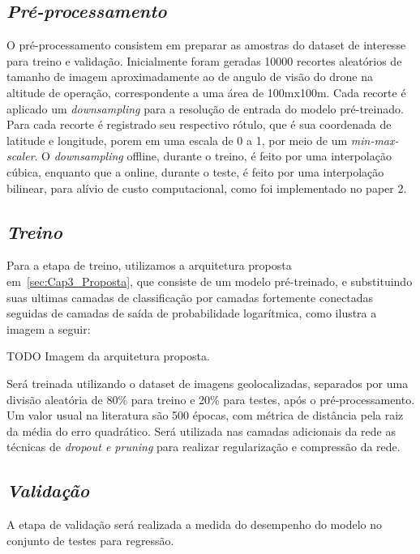 \subsection{\textit{Pré-processamento}}\label{sec:Cap3_PreProcess}
O pré-processamento consistem em preparar as amostras do dataset de interesse para treino e validação. Inicialmente foram geradas 10000 recortes aleatórios de tamanho de imagem aproximadamente ao de angulo de visão do drone na altitude de operação, correspondente a uma área de 100mx100m. Cada recorte é aplicado um \textit{downsampling} para a resolução de entrada do modelo pré-treinado. Para cada recorte é registrado seu respectivo rótulo, que é sua coordenada de latitude e longitude, porem em uma escala de 0 a 1, por meio de um \textit{min-max-scaler}. O \textit{downsampling} offline, durante o treino, é feito por uma interpolação cúbica, enquanto que a online, durante o teste, é feito por uma interpolação bilinear, para alívio de custo computacional, como foi implementado no paper 2.

\subsection{\textit{Treino}}\label{sec:Cap3_Treino}
Para a etapa de treino, utilizamos a arquitetura proposta em~\ref{sec:Cap3_Proposta}, que consiste de um modelo pré-treinado, e substituindo suas ultimas camadas de classificação por camadas fortemente conectadas seguidas de camadas de saída de probabilidade logarítmica, como ilustra a imagem a seguir:


TODO Imagem da arquitetura proposta.

Será treinada utilizando o dataset de imagens geolocalizadas, separados por uma divisão aleatória de 80\% para treino e 20\% para testes, após o pré-processamento. Um valor usual na literatura são 500 épocas, com métrica de distância pela raiz da média do erro quadrático. Será utilizada nas camadas adicionais da rede as técnicas de \textit{dropout e pruning} para realizar regularização e compressão da rede.




\subsection{\textit{Validação}}\label{sec:Cap3_Validacao}

A etapa de validação será realizada a medida do desempenho do modelo no conjunto de testes para regressão.




